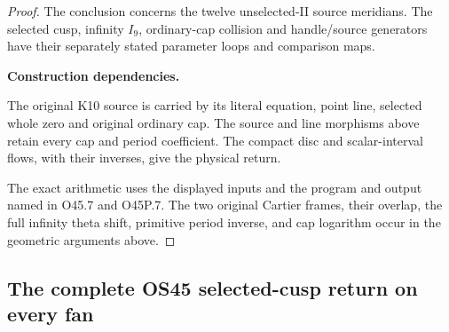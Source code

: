 \begin{proof}
The conclusion concerns the twelve unselected-II source meridians.
The selected cusp, infinity \(I_9\), ordinary-cap collision and
handle/source generators have their separately stated parameter
loops and comparison maps.




\par\medskip\noindent\textbf{Construction dependencies.}\par
The original K10 source is carried by its literal equation,
point line, selected whole zero and original ordinary cap.
The source and line morphisms above retain every cap and
period coefficient. The compact disc and scalar-interval
flows, with their inverses, give the physical return.

The exact arithmetic uses the displayed inputs and the
program and output named in O45.7 and O45P.7.
The two original Cartier frames, their overlap, the full
infinity theta shift, primitive period inverse, and cap
logarithm occur in the geometric arguments above.



\end{proof}


\subsection{The complete OS45 selected-cusp return on every fan}
